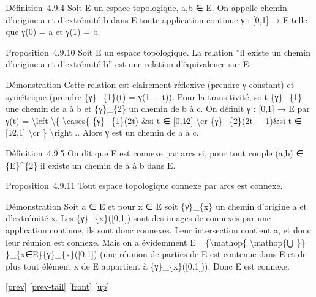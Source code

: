 \documentclass[]{article}
\begin{document}
Définition~4.9.4 Soit E un espace topologique, a,b ∈ E. On appelle
chemin d'origine a et d'extrémité b dans E toute application continue γ
: {[}0,1{]} → E telle que γ(0) = a et γ(1) = b.

Proposition~4.9.10 Soit E un espace topologique. La relation ''il existe
un chemin d'origine a et d'extrémité b'' est une relation d'équivalence
sur E.

Démonstration Cette relation est clairement réflexive (prendre γ
constant) et symétrique (prendre \{γ\}\_\{1\}(t) = γ(1 − t)). Pour la
transitivité, soit \{γ\}\_\{1\} une chemin de a à b et \{γ\}\_\{2\} un
chemin de b à c. On définit γ : {[}0,1{]} → E par γ(t) =
\textbackslash{}left \textbackslash{}\{ \textbackslash{}cases\{
\{γ\}\_\{1\}(2t) \&si t ∈ {[}0,1∕2{]} \textbackslash{}cr \{γ\}\_\{2\}(2t
− 1)\&si t ∈ {[}1∕2,1{]} \textbackslash{}cr \} \textbackslash{}right ..
Alors γ est un chemin de a à c.

Définition~4.9.5 On dit que E est connexe par arcs si, pour tout couple
(a,b) ∈ \{E\}\^{}\{2\} il existe un chemin de a à b dans E.

Proposition~4.9.11 Tout espace topologique connexe par arcs est connexe.

Démonstration Soit a ∈ E et pour x ∈ E soit \{γ\}\_\{x\} un chemin
d'origine a et d'extrémité x. Les \{γ\}\_\{x\}({[}0,1{]}) sont des
images de connexes par une application continue, ils sont donc connexes.
Leur intersection contient a, et donc leur réunion est connexe. Mais on
a évidemment E =\{\textbackslash{}mathop\{ \textbackslash{}mathop\{⋃
\}\} \}\_\{x∈E\}\{γ\}\_\{x\}({[}0,1{]}) (une réunion de parties de E est
contenue dans E et de plus tout élément x de E appartient à
\{γ\}\_\{x\}({[}0,1{]})). Donc E est connexe.

{[}\href{coursse25.html}{prev}{]}
{[}\href{coursse25.html\#tailcoursse25.html}{prev-tail}{]}
{[}\href{coursse26.html}{front}{]}
{[}\href{coursch5.html\#coursse26.html}{up}{]}
\end{document}
